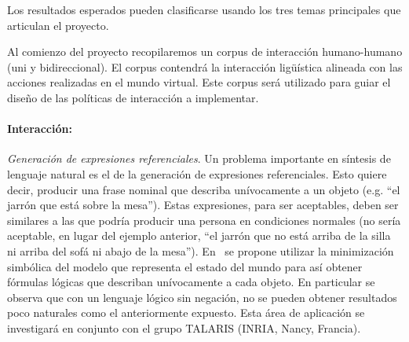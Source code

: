 
\vspace*{.2cm}%



Los resultados esperados pueden clasificarse usando los
tres temas principales que articulan el proyecto.


Al comienzo del proyecto recopilaremos
un corpus de interacci\'on humano-humano (uni y bidireccional).  El
corpus contendr\'a la interacci\'on lig\"u\'istica alineada con
las acciones realizadas en el mundo virtual.  Este corpus
ser\'a utilizado para guiar el dise\~no de las pol\'iticas
de interacci\'on a implementar.


%
%
%
%
%
%
%
%
%
%



\paragraph{Interacci\'on:}

\emph{Generaci\'on de expresiones referenciales}. Un problema importante en
s\'intesis de lenguaje natural es el de la generaci\'on de expresiones
referenciales. Esto quiere decir, producir una frase nominal que describa
un\'ivocamente a un objeto (e.g. ``el jarr\'on que est\'a sobre la mesa'').
Estas expresiones, para ser aceptables, deben ser similares a las que podr\'ia
producir una persona en condiciones normales (no ser\'ia aceptable, en lugar del
ejemplo anterior, ``el jarr\'on que no est\'a arriba de la silla ni arriba del
sof\'a ni abajo de la mesa'').  En~\cite{AKS08} se propone utilizar la
minimizaci\'on simb\'olica del modelo que representa
el estado del mundo para as\'i obtener f\'ormulas l\'ogicas que describan
un\'ivocamente a cada objeto. En particular se observa que con un
lenguaje l\'ogico sin negaci\'on, no se pueden obtener resultados poco
naturales como el anteriormente expuesto. Esta \'area de aplicaci\'on se
investigar\'a en conjunto con el grupo TALARIS (INRIA,
Nancy, Francia).

